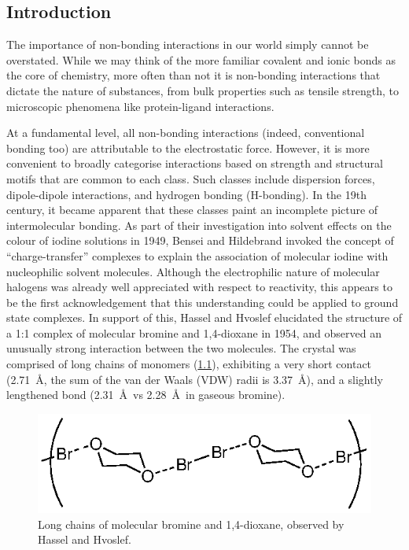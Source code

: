 \begin{refsection}
\chapter{Introduction}

The importance of non-bonding interactions in our world simply cannot be overstated.
While we may think of the more familiar covalent and ionic bonds as the core of chemistry, more often than not it is non-bonding interactions that dictate the nature of substances, from bulk properties such as tensile strength, to microscopic phenomena like protein-ligand interactions.

At a fundamental level, all non-bonding interactions (indeed, conventional bonding too) are attributable to the electrostatic force.
However, it is more convenient to broadly categorise interactions based on strength and structural motifs that are common to each class.
Such classes include dispersion forces, dipole-dipole interactions, and hydrogen bonding (H-bonding).
In the 19th century, it became apparent that these classes paint an incomplete picture of intermolecular bonding.
As part of their investigation into solvent effects on the colour of iodine solutions in 1949, Bensei and Hildebrand invoked the concept of ``charge-transfer'' complexes to explain the association of molecular iodine with nucleophilic solvent molecules.\autocite{Benesi1949}
Although the electrophilic nature of molecular halogens was already well appreciated with respect to reactivity, this appears to be the first acknowledgement that this understanding could be applied to ground state complexes.
In support of this, Hassel and Hvoslef elucidated the structure of a 1:1 complex of molecular bromine and 1,4-dioxane in 1954, and observed an unusually strong interaction between the two molecules.\autocite{Hassel1954}
The crystal was comprised of long chains of monomers (\cref{fig:hassel-xray}), exhibiting a very short  contact (2.71~\AA, the sum of the van der Waals (VDW) radii is 3.37~\AA), and a slightly lengthened  bond (2.31~\AA\ vs 2.28~\AA\ in gaseous bromine).

\begin{figure}[ht]
  \includegraphics[width=0.6\columnwidth]{Figures/hassel-xray.eps}
  \caption[Bromine-dioxane complex.]{Long chains of molecular bromine and 1,4-dioxane, observed by Hassel and Hvoslef.}\label{fig:hassel-xray}
\end{figure}


\end{refsection}
